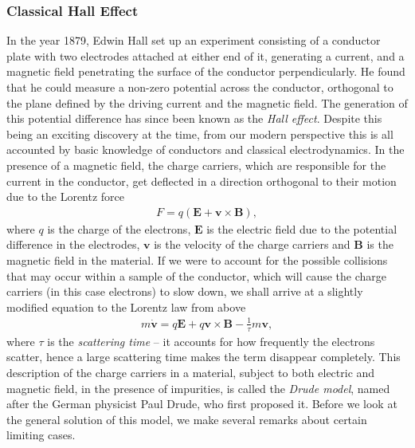         \subsubsection*{Classical Hall Effect}
        In the year 1879, Edwin Hall set up an experiment consisting of a conductor plate with two electrodes attached at either end of it, generating a current, and a magnetic field penetrating the surface of the conductor perpendicularly. He found that he could measure a non-zero potential across the conductor, orthogonal to the plane defined by the driving current and the magnetic field. The generation of this potential difference has since been known as the \textit{Hall effect}. Despite this being an exciting discovery at the time, from our modern perspective this is all accounted by basic knowledge of conductors and classical electrodynamics. In the presence of a magnetic field, the charge carriers, which are responsible for the current in the conductor, get deflected in a direction orthogonal to their motion due to the Lorentz force
        \begin{align}
            F = q(\bm{E} + \bm{v}\times \bm{B}),
        \end{align}
        where $q$ is the charge of the electrons, $\bm{E}$ is the electric field due to the potential difference in the electrodes, $\bm{v}$ is the velocity of the charge carriers and $\bm{B}$ is the magnetic field in the material. If we were to account for the possible collisions that may occur within a sample of the conductor, which will cause the charge carriers (in this case electrons) to slow down, we shall arrive at a slightly modified equation to the Lorentz law from above
        \begin{align}
            m \dot{\bm{v}} = q \bm{E}+q \bm{v}\times \bm{B} - \frac{1}{\tau} m \bm{v}, \label{eq:Drude_Model_Background}
        \end{align}
        where $\tau$ is the \textit{scattering time} -- it accounts for how frequently the electrons scatter, hence a large scattering time makes the term disappear completely. This description of the charge carriers in a material, subject to both electric and magnetic field, in the presence of impurities, is called the \textit{Drude model}, named after the German physicist Paul Drude, who first proposed it. Before we look at the general solution of this model, we make several remarks about certain limiting cases.

